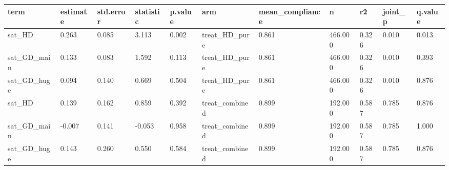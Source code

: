 \begin{tabular}{lllllllllll}
\toprule
term & estimate & std.error & statistic & p.value & arm & mean\_compliance & n & r2 & joint\_p & q.value
 \\
\midrule
sat\_HD & 0.263 & 0.085 & 3.113 & 0.002 & treat\_HD\_pure & 0.861 & 466.000 & 0.326 & 0.010 & 0.013 \\
sat\_GD\_main & 0.133 & 0.083 & 1.592 & 0.113 & treat\_HD\_pure & 0.861 & 466.000 & 0.326 & 0.010 & 0.393 \\
sat\_GD\_huge & 0.094 & 0.140 & 0.669 & 0.504 & treat\_HD\_pure & 0.861 & 466.000 & 0.326 & 0.010 & 0.876 \\
sat\_HD & 0.139 & 0.162 & 0.859 & 0.392 & treat\_combined & 0.899 & 192.000 & 0.587 & 0.785 & 0.876 \\
sat\_GD\_main & -0.007 & 0.141 & -0.053 & 0.958 & treat\_combined & 0.899 & 192.000 & 0.587 & 0.785 & 1.000 \\
sat\_GD\_huge & 0.143 & 0.260 & 0.550 & 0.584 & treat\_combined & 0.899 & 192.000 & 0.587 & 0.785 & 0.876 \\
\bottomrule
\end{tabular}
